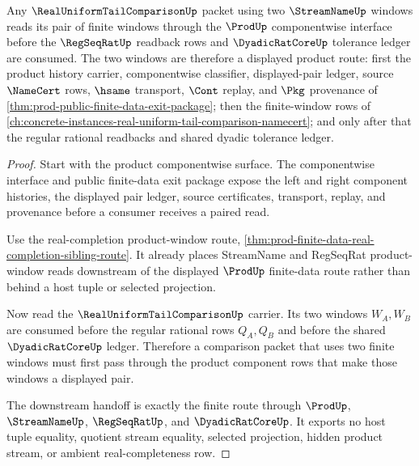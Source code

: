 \begin{theorem}
\label{thm:prod-real-tail-window-forward-link}
Any $\RealUniformTailComparisonUp$ packet using two $\StreamNameUp$ windows reads its pair of finite windows through the $\ProdUp$ componentwise interface before the $\RegSeqRatUp$ readback rows and $\DyadicRatCoreUp$ tolerance ledger are consumed. The two windows are therefore a displayed product route: first the product history carrier, componentwise classifier, displayed-pair ledger, source $\NameCert$ rows, $\hsame$ transport, $\Cont$ replay, and $\Pkg$ provenance of \autoref{thm:prod-public-finite-data-exit-package}; then the finite-window rows of \autoref{ch:concrete-instances-real-uniform-tail-comparison-namecert}; and only after that the regular rational readbacks and shared dyadic tolerance ledger.
\end{theorem}
\begin{proof}
Start with the product componentwise surface. The componentwise interface and public finite-data exit package expose the left and right component histories, the displayed pair ledger, source certificates, transport, replay, and provenance before a consumer receives a paired read.

Use the real-completion product-window route, \autoref{thm:prod-finite-data-real-completion-sibling-route}. It already places StreamName and RegSeqRat product-window reads downstream of the displayed $\ProdUp$ finite-data route rather than behind a host tuple or selected projection.

Now read the $\RealUniformTailComparisonUp$ carrier. Its two windows $W_A,W_B$ are consumed before the regular rational rows $Q_A,Q_B$ and before the shared $\DyadicRatCoreUp$ ledger. Therefore a comparison packet that uses two finite windows must first pass through the product component rows that make those windows a displayed pair.

The downstream handoff is exactly the finite route through $\ProdUp$, $\StreamNameUp$, $\RegSeqRatUp$, and $\DyadicRatCoreUp$. It exports no host tuple equality, quotient stream equality, selected projection, hidden product stream, or ambient real-completeness row.
\end{proof}
